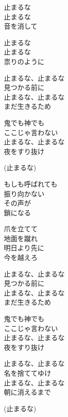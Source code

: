 \begin{lyrics}
\begin{japanese}
止まるな\\
止まるな\\
音を消して

止まるな\\
止まるな\\
祟りのように
\end{japanese}

\begin{japanese}
止まるな、止まるな\\
見つかる前に\\
止まるな、止まるな\\
まだ生きるため

鬼でも神でも\\
ここじゃ言わない\\
止まるな、止まるな\\
夜をすり抜け

(止まるな)
\end{japanese}

\begin{japanese}
もしも呼ばれても\\
振り向かない\\
その声が\\
鎖になる

爪を立てて\\
地面を蹴れ\\
明日より先に\\
今を越えろ
\end{japanese}

\begin{japanese}
止まるな、止まるな\\
見つかる前に\\
止まるな、止まるな\\
まだ生きるため

鬼でも神でも\\
ここじゃ言わない\\
止まるな、止まるな\\
夜をすり抜け

止まるな、止まるな\\
名を捨ててゆけ\\
止まるな、止まるな\\
朝に消えるまで

(止まるな)
\end{japanese}
\end{lyrics}
